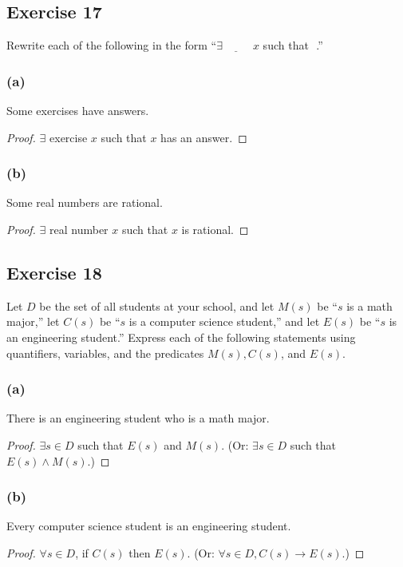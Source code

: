 \documentclass[14pt]{extarticle}
\newcommand{\fbl}{\underline{\hspace{1cm}}\,\,}
\newcommand{\fa}{\forall}
\newcommand{\te}{\exists}
\begin{document}
\subsection{Exercise 17}
Rewrite each of the following in the form “$\te \fbl x$ such that \fbl.”

\subsubsection{(a)}
Some exercises have answers.

\begin{proof}
    $\te$ exercise $x$ such that $x$ has an answer.
\end{proof}

\subsubsection{(b)}
Some real numbers are rational.

\begin{proof}
    $\te$ real number $x$ such that $x$ is rational.
\end{proof}

\subsection{Exercise 18}
Let $D$ be the set of all students at your school, and let $M(s)$ be “$s$ is a math major,” let $C(s)$ be “$s$ is a computer science student,” and let $E(s)$ be “$s$ is an engineering student.” Express each of the following statements using quantifiers, variables, and the predicates $M(s), C(s)$, and $E(s)$.

\subsubsection{(a)}
There is an engineering student who is a math major.

\begin{proof}
    $\te s \in D$ such that $E(s)$ and $M(s)$. (Or: $\te s \in D$ such that $E(s) \wedge M(s)$.)
\end{proof}

\subsubsection{(b)}
Every computer science student is an engineering student.

\begin{proof}
    $\fa s \in D$, if $C(s)$ then $E(s)$. (Or: $\fa s \in D, C(s) \to E(s)$.)
\end{proof}
\end{document}
